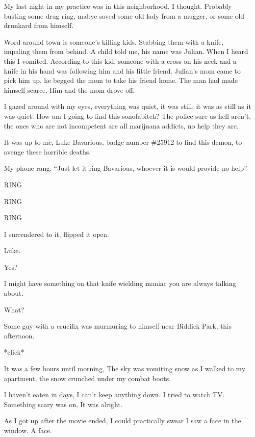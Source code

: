 My last night in my practice was in this neighborhood, I thought.
Probably busting some drug ring, mabye saved some old lady from a
mugger, or some old drunkard from himself.



Word around town is someone's killing kids. Stabbing them with a
knife, impaling them from behind. A child told me, his name was
Julian. When I heard this I vomited. According to this kid, someone
with a cross on his neck and a knife in his hand was following him
and his little friend. Julian's mom came to pick him up, he begged
the mom to take his friend home. The man had made himself scarce.
Him and the mom drove off.



I gazed around with my eyes, everything was quiet, it was still; it
was as still as it was quiet. How am I going to find this
sonofabitch? The police sure as hell aren't, the ones who are not
incompetent are all marijuana addicts, no help they are.



It was up to me, Luke Bavarious, badge number \#25912 to find this
demon, to avenge these horrible deaths.



My phone rang. ``Just let it ring Bavarious, whoever it is would
provide no help''

RING

RING

RING

I surrendered to it, flipped it open.



Luke.

Yes?

I might have something on that knife wielding maniac you are always
talking about.

What?

Some guy with a crucifix was murmuring to himself near Biddick
Park, this afternoon.

*click*



It was a few hours until morning, The sky was vomiting snow as I
walked to my apartment, the snow crunched under my combat
boots.



I haven't eaten in days, I can't keep anything down. I tried to
watch TV. Something scary was on, It was alright.

As I got up after the movie ended, I could practically swear I saw
a face in the window. A face.



